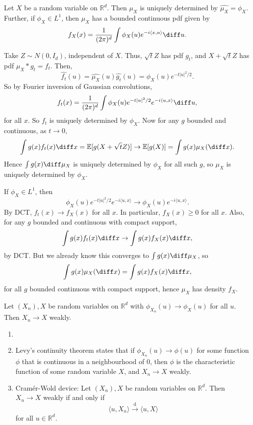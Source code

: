 \documentclass[12pt]{article}
\begin{document}
\begin{theorem}
	Let $X$ be a random variable on $\mathbb{R}^d$. Then $\mu_X$ is uniquely determined by $\hat{\mu_X} = \phi_X$. Further, if $\phi_X \in L^1$, then $\mu_X$ has a bounded continuous pdf given by
	\[
	f_X(x) = \frac{1}{(2 \pi)^d} \int \phi_X(u) e^{-i\langle x, u\rangle} \diff u.
	\]
\end{theorem}

\begin{proofbox}
	Take $Z \sim N(0, I_d)$, independent of $X$. Thus, $\sqrt t Z$ has pdf $g_t$, and $X + \sqrt t Z$ has pdf $\mu_X \ast g_t = f_t$. Then,
	\[
		\hat{f_t}(u) = \hat{\mu_X}(u)\hat{g_t}(u) = \phi_X(u) e^{-t|u|^2/2}.
	\]
	So by Fourier inversion of Gaussian convolutions,
	\[
	f_t(x) = \frac{1}{(2 \pi)^d} \int \phi_X(u) e^{-t|u|^2/2} e^{-i\langle u, x\rangle} \diff u,
	\]
	for all $x$. So $f_t$ is uniquely determined by $\phi_X$. Now for any $g$ bounded and continuous, as $t \to 0$,
	\[
	\int g(x) f_t(x) \diff x = \mathbb{E}[g(X + \sqrt t Z)] \to \mathbb{E}[g(X)] = \int g(x) \mu_X(\diff x).
	\]
	Hence $\int g(x) \diff \mu_X$ is uniquely determined by $\phi_X$ for all such $g$, so $\mu_X$ is uniquely determined by $\phi_X$.

	If $\phi_X \in L^1$, then
	\[
	\phi_X(u) e^{-t |u|^2/2} e^{-i \langle u, x\rangle} \to \phi_X(u) e^{-i \langle u, x\rangle}.
	\]
	By DCT, $f_t(x) \to f_X(x)$ for all $x$. In particular, $f_X(x) \geq 0$ for all $x$. Also, for any $g$ bounded and continuous with compact support,
	\[
	\int g(x) f_t(x) \diff x \to \int g(x) f_X(x) \diff x,
	\]
	by DCT. But we already know this converges to $\int g(x) \diff \mu_X$, so
	\[
	\int g(x) \mu_X( \diff x) = \int g(x) f_X(x) \diff x,
	\]
	for all $g$ bounded continuous with compact support, hence $\mu_X$ has density $f_X$.
\end{proofbox}

\begin{theorem}[Levy]
	Let $(X_n), X$ be random variables on $\mathbb{R}^d$ with $\phi_{X_n}(u) \to \phi_X(u)$ for all $u$. Then $X_n \to X$ weakly.
\end{theorem}

\begin{remark}
	\begin{enumerate}
		\item[]
		\item Levy's continuity theorem states that if $\phi_{X_n}(u) \to \phi(u)$ for some function $\phi$ that is continuous in a neighbourhood of $0$, then $\phi$ is the characteristic function of some random variable $X$, and $X_n \to X$ weakly.
		\item Cram\'er-Wold device: Let $(X_n), X$ be random variables on $\mathbb{R}^d$. Then $X_n \to X$ weakly if and only if
			\[
				\langle u, X_n\rangle \overset{\text{d}}{\to} \langle u, X\rangle
			\]
			for all $u \in \mathbb{R}^d$.
	\end{enumerate}
\end{remark}
\end{document}
